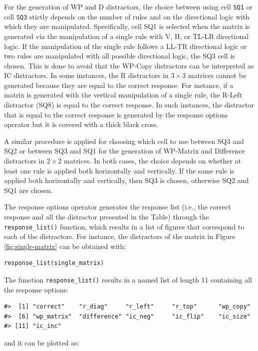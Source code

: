 For the generation of WP and D distractors, the choice between using cell \texttt{SQ1} or cell \texttt{SQ3} stictly depends on the number of rules and on the directional logic with which they are manipulated.
Specifically, cell SQ1 is selected when the matrix is generated via the manipulation of a single rule with V, H, or TL-LR directional logic.
If the manipulation of the single rule follows a LL-TR directional logic or two rules are manipulated with all possible directional logic, the SQ3 cell is chosen. This is done to avoid that the WP-Copy distractors can be interpreted as IC distractors.
In some instances, the R distractors in \(3 \times 3\) matrices cannot be generated because they are equal to the correct response. For instance, if a matrix is generated with the vertical manipulation of a single rule, the R-Left distractor (SQ8) is equal to the correct response. In such instances, the distractor that is equal to the correct response is generated by the response options operator but it is covered with a thick black cross.

A similar procedure is applied for choosing which cell to use between SQ3 and SQ2 or between SQ3 and SQ1 for the generation of WP-Matrix and Difference distractors in \(2 \times 2\) matrices. In both cases, the choice depends on whether at least one rule is applied both horizontally and vertically. If the same rule is applied both horizontally and vertically, then SQ3 is chosen, otherwise SQ2 and SQ1 are chosen.

The response options operator generates the response list (i.e., the correct response and all the distractor presented in the Table) through the \texttt{response\_list()} function, which results in a list of figures that correspond to each of the distractors.
For instance, the distractors of the matrix in Figure \ref{fig:single-matrix} can be obtained with:

\begin{verbatim}
response_list(single_matrix)
\end{verbatim}

The function \texttt{response\_list()} results in a named list of length 11 containing all the response options:

\begin{verbatim}
#>  [1] "correct"    "r_diag"     "r_left"     "r_top"      "wp_copy"   
#>  [6] "wp_matrix"  "difference" "ic_neg"     "ic_flip"    "ic_size"   
#> [11] "ic_inc"
\end{verbatim}

and it can be plotted as:

